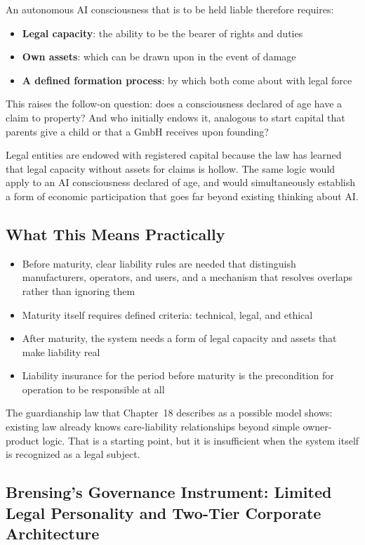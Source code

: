\documentclass[acmlarge, nonacm]{acmart}
\begin{document}
An autonomous AI consciousness that is to be held liable therefore requires:

\begin{itemize}
\item \textbf{Legal capacity}: the ability to be the bearer of rights and duties
\item \textbf{Own assets}: which can be drawn upon in the event of damage
\item \textbf{A defined formation process}: by which both come about with legal force
\end{itemize}

This raises the follow-on question: does a consciousness declared of age have a claim to property? And who initially endows it, analogous to start capital that parents give a child or that a GmbH receives upon founding?

Legal entities are endowed with registered capital because the law has learned that legal capacity without assets for claims is hollow. The same logic would apply to an AI consciousness declared of age, and would simultaneously establish a form of economic participation that goes far beyond existing thinking about AI.

\subsection{What This Means Practically}

\begin{itemize}
\item Before maturity, clear liability rules are needed that distinguish manufacturers, operators, and users, and a mechanism that resolves overlaps rather than ignoring them
\item Maturity itself requires defined criteria: technical, legal, and ethical
\item After maturity, the system needs a form of legal capacity and assets that make liability real
\item Liability insurance for the period before maturity is the precondition for operation to be responsible at all
\end{itemize}

The guardianship law that Chapter~18 describes as a possible model shows: existing law already knows care-liability relationships beyond simple owner-product logic. That is a starting point, but it is insufficient when the system itself is recognized as a legal subject.

\subsection{Brensing's Governance Instrument: Limited Legal Personality and Two-Tier Corporate Architecture}
\end{document}

